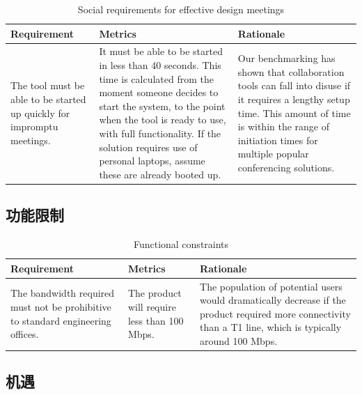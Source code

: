 \begin{table}[!h]
        \centering
                \begin{tabular}{| p{42mm} | p{42mm} | p{51mm} |}
                \hline
                \textbf{Requirement}    & \textbf{Metrics} & \textbf{Rationale} \\
                \hline
The tool must be able to be started up quickly for impromptu meetings.  & It must be able to be started in less than 40 seconds. This time is calculated from the moment someone decides to start the system, to the point when the tool is ready to use, with full functionality. If the solution requires use of personal laptops, assume these are already booted up. & Our benchmarking has shown that collaboration tools can fall into disuse if it requires a lengthy setup time. This amount of time is within the range of initiation times for multiple popular conferencing solutions. \\ \hline

        \end{tabular}
        \caption{Social requirements for effective design meetings}
        \label{tab:mediums3}
\end{table}



\newpage

\subsection{功能限制}

\begin{table}[!h]
        \centering
                \begin{tabular}{| p{44mm} | p{49mm} | p{42mm} |}
                \hline
                \textbf{Requirement}    & \textbf{Metrics} & \textbf{Rationale} \\
                \hline
                The bandwidth required must not be prohibitive to standard engineering offices. & The product will require less than 100 Mbps.& The population of potential users would dramatically decrease if the product required more connectivity than a T1 line, which is typically around 100 Mbps.\\ \hline
                        \end{tabular}
        \caption{Functional constraints}
        \label{tab:fconstraints}
\end{table}


\subsection{机遇}


